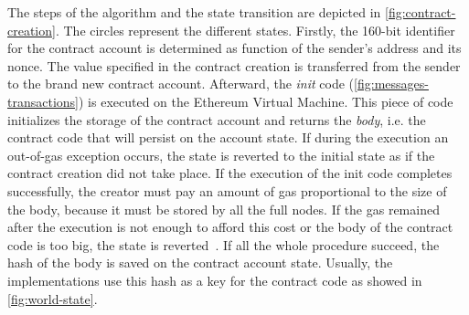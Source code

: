 The steps of the algorithm and the state transition are depicted in
\autoref{fig:contract-creation}. The circles represent the different states.
Firstly, the 160-bit identifier for the contract account is determined as
function of the sender's address and its nonce. The value specified in the
contract creation is transferred from the sender to the brand new contract
account. Afterward, the \emph{init} code (\autoref{fig:messages-transactions})
is executed on the Ethereum Virtual Machine. This  piece of code initializes the
storage of the contract account and returns the \emph{body}, i.e. the contract
code that will persist on the account state. If during the execution an
out-of-gas exception occurs, the state is reverted to the initial state as if
the contract creation did not take place. If the execution of the init code
completes successfully, the creator must pay an amount of gas proportional to
the size of the body, because it must be stored by all the full nodes. If the
gas remained after the execution is not enough to afford this cost or the body
of the contract code is too big, the state is reverted~\cite{wood2018ethereum}.
If all the whole procedure succeed, the hash of the body is saved on the
contract account state. Usually, the implementations use this hash as a key for
the contract code as showed in \autoref{fig:world-state}.
